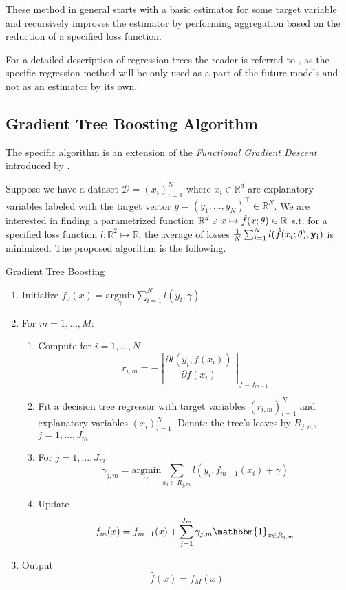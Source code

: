\documentclass[a4paper, oneside]{discothesis}
\begin{document}
These method in general starts with a basic estimator for some target variable and recursively improves the estimator by performing aggregation based on the reduction of a specified loss function.

For a detailed description of regression trees the reader is referred to \cite{hastie01statisticallearning}, as the specific regression method will be only used as a part of the future models and not as an estimator by its own.

\subsection{Gradient Tree Boosting Algorithm}

The specific algorithm is an extension of the \textit{Functional Gradient Descent} introduced by \cite{FriedFGB}.

Suppose we have a dataset $\mathcal{D} = \left(x_i\right)_{i=1}^N$ where $x_i\in \mathbb{R}^d$ are explanatory variables labeled with the target vector $y = \left(y_1, \dots, y_N\right)^\intercal\in \mathbb{R}^N$. We are interested in finding a parametrized function $\mathbb{R}^d \ni x \mapsto \hat{f}(x; \bf{\theta})\in \mathbb{R}$ s.t. for a specified loss function $l:\mathbb{R}^2\mapsto\mathbb{R}$, the average of losses $\frac{1}{N}\sum_{i=1}^{N}l(\hat{f}(x_i; \bf{\theta}), y_i)$ is minimized.
The proposed algorithm is the following.

\begin{algorithm}
\caption{Gradient Tree Boosting}\label{alg:bg}
\begin{algorithmic}
\State \begin{enumerate} 

\item $\text{Initialize } f_0(x) = \underset{\gamma}{\mathrm{argmin }} \sum_{i=1}^N l(y_i, \gamma)$
\item For $m = 1, \dots, M$:

\begin{enumerate}
\item Compute for $i = 1, \dots, N$\[r_{i,m} = - \left[\frac{\partial l\left(y_i, f(x_i)\right)}{\partial f(x_i)}\right]_{f = f_{m-1}}\]

\item Fit a decision tree regressor with target variables $(r_{i,m})_{i=1}^N$ and explanatory variables $(x_i)_{i=1}^N$. Denote the tree's leaves by $R_{j, m}$, $j = 1, \dots, J_m$

\item For $j = 1,\dots, J_m$:
\[ \gamma_{j,m} = \underset{\gamma}{\mathrm{argmin }}\underset{x_i\in R_{j,m}}{\sum}l(y_i, f_{m-1}(x_i)+\gamma)\]
\item Update \[f_m(x) = f_{m-1}(x)+\sum_{j=1}^{J_m}\gamma_{j,m} \mathbbm{1}_{x\in R_{j,m}}\]

\end{enumerate}
\item Output \[\hat{f}(x) = f_M(x)\]

\end{enumerate} 
\end{algorithmic}
\end{algorithm}
\end{document}
